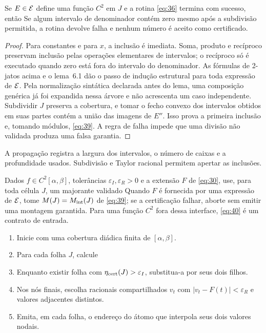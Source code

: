 \begin{proposicao}
Se $E\in\mathcal E$ define uma função $C^2$ em $J$ e a rotina \eqref{eq:36} termina com sucesso, então
Se algum intervalo de denominador contém zero mesmo após a subdivisão permitida, a rotina devolve falha e nenhum número é aceito como certificado.
\end{proposicao}
\begin{proof}
Para constantes e para $x$, a inclusão é imediata. Soma, produto e recíproco preservam inclusão pelas operações elementares de intervalos; o recíproco só é executado quando zero está fora do intervalo do denominador. As fórmulas de 2-jatos acima e o lema~6.1 dão o passo de indução estrutural para toda expressão de $\mathcal E$. Pela normalização sintática declarada antes do lema, uma composição genérica já foi expandida nessa árvore e não acrescenta um caso independente. Subdividir $J$ preserva a cobertura, e tomar o fecho convexo dos intervalos obtidos em suas partes contém a união das imagens de $E''$. Isso prova a primeira inclusão e, tomando módulos, \eqref{eq:39}. A regra de falha impede que uma divisão não validada produza uma falsa garantia.
\end{proof}
A propagação registra a largura dos intervalos, o número de caixas e a profundidade usados. Subdivisão e Taylor racional permitem apertar as inclusões.

\begin{algoritmo}
Dados $f\in C^2[\alpha,\beta]$, tolerâncias $\varepsilon_I,\varepsilon_R>0$ e a extensão $F$ de \eqref{eq:30}, use, para toda célula $J$, um majorante validado
Quando $F$ é fornecida por uma expressão de $\mathcal E$, tome $M(J)=M_{\rm int}(J)$ de \eqref{eq:39}; se a certificação falhar, aborte sem emitir uma montagem garantida. Para uma função $C^2$ fora dessa interface, \eqref{eq:40} é um contrato de entrada.
\begin{enumerate}[label=(\roman*),topsep=6pt,itemsep=3pt]
\item Inicie com uma cobertura diádica finita de $[\alpha,\beta]$.
\item Para cada folha $J$, calcule
\item Enquanto existir folha com $\eta_{\rm cert}(J)>\varepsilon_I$, substitua-a por seus dois filhos.
\item Nos nós finais, escolha racionais compartilhados $v_t$ com $|v_t-F(t)|<\varepsilon_R$ e valores adjacentes distintos.
\item Emita, em cada folha, o endereço do átomo que interpola seus dois valores nodais.
\end{enumerate}
\end{algoritmo}

